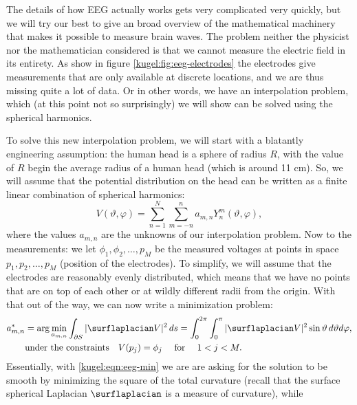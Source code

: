 The details of how EEG actually works gets very complicated very quickly, but we
will try our best to give an broad overview of the mathematical machinery that
makes it possible to measure brain waves. The problem neither the physicist nor
the mathematician considered is that we cannot measure the electric field in its
entirety. As show in figure \ref{kugel:fig:eeg-electrodes} the electrodes give
measurements that are only available at discrete locations, and we are thus
missing quite a lot of data. Or in other words, we have an interpolation
problem, which (at this point not so surprisingly) we will show can be solved
using the spherical harmonics.

To solve this new interpolation problem, we will start with a blatantly
engineering assumption: the human head is a sphere of radius $R$, with the value
of $R$ begin the average radius of a human head (which is around 11 cm). So, we
will assume that the potential distribution on the head can be written as a
finite linear combination of spherical harmonics:
\begin{equation*}
  V(\vartheta, \varphi)
    = \sum_{n=1}^N \sum_{m=-n}^n a_{m,n} Y^m_n(\vartheta, \varphi),
\end{equation*}
where the values $a_{m,n}$ are the unknowns of our interpolation problem. Now to
the measurements: we let $\phi_1, \phi_2, \ldots, p_M$ be the measured voltages
at points in space $p_1, p_2, \ldots, p_M$ (position of the electrodes). To
simplify, we will assume that the electrodes are reasonably evenly distributed,
which means that we have no points that are on top of each other or at wildly
different radii from the origin. With that out of the way, we can now write a
minimization problem:
\begin{subequations}
  \begin{align}
    a_{m,n}^* &= \arg \min_{a_{m,n}}
      \int_{\partial S} | \surflaplacian V |^2 \, ds 
      = \int_0^{2\pi} \int_{0}^\pi | \surflaplacian V |^2
        \sin \vartheta \, d\vartheta d\varphi, 
        \label{kugel:eqn:eeg-min} \\
    &\text{under the constraints} \quad V(p_j) = \phi_j
      \quad \text{ for } \quad 1 < j < M.
      \label{kugel:eqn:eeg-min-constraints}
  \end{align}
\end{subequations}
Essentially, with \eqref{kugel:eqn:eeg-min} we are are asking for the solution
to be smooth by minimizing the square of the total curvature (recall that the
surface spherical Laplacian $\surflaplacian$ is a measure of curvature), while
